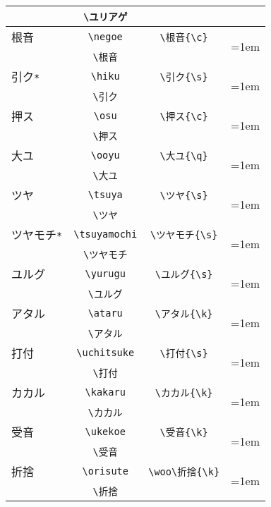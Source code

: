 \documentclass[a4paper,luatex]{l3doc}
\def\fu#1{%
{%
  \tanni=1em%
    \begin{tikzpicture}[x=\tanni,y=\tanni]%
     #1%
    \end{tikzpicture}%
}}%
\begin{document}
\begin{longtable}{|l|c|c|c|}
&\verb|\ユリアゲ|&&\\\hline
根音&\verb|\negoe|&\verb|\根音{\c}|&\multirow{2}{*}{\fu{\根音{\c}}}\\\nopagebreak
&\verb|\根音|&&\\\hline
引ク\verb|*|&\verb|\hiku|&\verb|\引ク{\s}|&\multirow{2}{*}{\fu{\引ク{\s}}}\\\nopagebreak
&\verb|\引ク|&&\\\hline
押ス&\verb|\osu|&\verb|\押ス{\c}|&\multirow{2}{*}{\fu{\押ス{\c}}}\\\nopagebreak
&\verb|\押ス|&&\\\hline
大ユ&\verb|\ooyu|&\verb|\大ユ{\q}|&\multirow{2}{*}{\fu{\大ユ{\q}}}\\\nopagebreak
&\verb|\大ユ|&&\\\hline
ツヤ&\verb|\tsuya|&\verb|\ツヤ{\s}|&\multirow{2}{*}{\fu{\ツヤ{\s}}}\\\nopagebreak
&\verb|\ツヤ|&&\\\hline
ツヤモチ\verb|*|&\verb|\tsuyamochi|&\verb|\ツヤモチ{\s}|&\multirow{2}{*}{\fu{\ツヤモチ{\s}}}\\\nopagebreak&\verb|\ツヤモチ|&&\\\hline
ユルグ&\verb|\yurugu|&\verb|\ユルグ{\s}|&\multirow{2}{*}{\fu{\ユルグ{\s}}}\\\nopagebreak
&\verb|\ユルグ|&&\\\hline
アタル&\verb|\ataru|&\verb|\アタル{\k}|&\multirow{2}{*}{\fu{\アタル{\k}}}\\\nopagebreak
&\verb|\アタル|&&\\\hline
打付&\verb|\uchitsuke|&\verb|\打付{\s}|&\multirow{2}{*}{\fu{\打付{\s}}}\\\nopagebreak
&\verb|\打付|&&\\\hline
カカル&\verb|\kakaru|&\verb|\カカル{\k}|&\multirow{2}{*}{\fu{\カカル{\k}}}\\\nopagebreak
&\verb|\カカル|&&\\\hline
受音&\verb|\ukekoe|&\verb|\受音{\k}|&\multirow{2}{*}{\fu{\受音{\k}}}\\\nopagebreak
&\verb|\受音|&&\\\hline
折捨&\verb|\orisute|&\verb|\woo\折捨{\k}|&\multirow{2}{*}{\fu{\woo\折捨{\w}}}\\\nopagebreak
&\verb|\折捨|&&\\\hline
\end{longtable}
\end{document}

